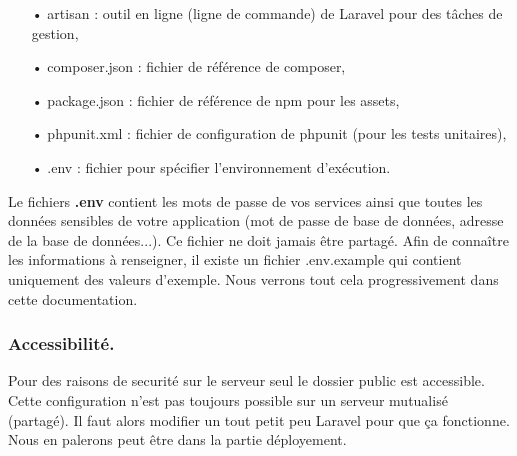 \documentclass[12pt,a4paper]{article}
\begin{document}
\begin{itemize}
\item[•] artisan : outil en ligne (ligne de commande) de Laravel pour des tâches de gestion,
\item[•] composer.json : fichier de référence de composer,
\item[•] package.json : fichier de référence de npm pour les assets,
\item[•] phpunit.xml : fichier de configuration de phpunit (pour les tests unitaires),
\item[•] .env : fichier pour spécifier l'environnement d'exécution.
\end{itemize}
Le fichiers \textbf{.env} contient les mots de passe de vos services ainsi que toutes les
données sensibles de votre application (mot de passe de base de données, adresse de la base de données...). Ce fichier ne doit jamais être partagé. Afin de connaître les informations à
renseigner, il existe un fichier .env.example qui contient uniquement des valeurs d'exemple.
Nous verrons tout cela progressivement dans cette documentation.

\subsubsection{Accessibilité.}
Pour des raisons de securité sur le serveur seul le dossier public est accessible.
Cette configuration n'est pas toujours possible sur un serveur mutualisé (partagé). Il faut alors modifier un tout petit peu Laravel pour que ça fonctionne. Nous en palerons peut être dans la partie déployement.

\newpage
\end{document}
